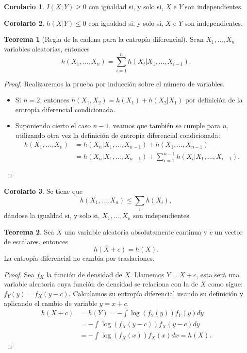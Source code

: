 \documentclass[12pt,a4paper]{report} %
\theoremstyle{definition}
\newtheorem{theorem}{Teorema}[section]
\newtheorem{corollary}{Corolario}[theorem]
\begin{document}
\begin{corollary}\label{c:im_indc}
$I(X;Y)\ge 0$ con igualdad si, y solo si, $X$ e $Y$ son independientes.\\
\end{corollary}

\begin{corollary}
$h(X|Y) \le 0$ con igualdad si, y solo si, $X$ e $Y$ son independientes.\\
\end{corollary}

\begin{theorem}[Regla de la cadena para la entropía diferencial] Sean $X_1,\dots, X_n$ variables aleatorias, entonces
  \[
h(X_1,\dots,X_n) = \sum_{i=1}^n h(X_i|X_1,\dots, X_{i-1}).
  \]
\end{theorem}

\begin{proof}
  Realizaremos la prueba por inducción sobre el número de variables.
  \begin{itemize}
  \item Si $n=2$, entonces $h(X_1,X_2) = h(X_1) + h(X_2|X_1)$ por definición de la entropía diferencial condicionada.
  \item Suponiendo cierto el caso $n-1$, veamos que también se cumple para $n$, utilizando otra vez la definición de entropía diferencial condicionada:
    \begin{align*}
h(X_1,\dots,X_n) &= h(X_n|X_1,\dots, X_{n-1}) + h(X_1,\dots, X_{n-1})\\ &= h(X_n|X_1,\dots,X_{n-1}) + \sum_{i=1}^{n-1}h(X_i|X_1,\dots,X_{i-1}).
    \end{align*}
  \end{itemize}
\end{proof}

\begin{corollary} Se tiene que
  \[h(X_1,\dots, X_n) \leq \sum_i h(X_i),\]
  dándose la igualdad si, y solo si, $X_1,\dots, X_n$ son independientes.\\
\end{corollary}

\begin{theorem}
  Sea $X$ una variable aleatoria absolutamente continua y $c$ un vector de escalares, entonces
  \[
  h(X+c) = h(X).
  \]
  La entropía diferencial no cambia por traslaciones.
\end{theorem}

\begin{proof}
  Sea $f_X$ la función de densidad de $X$. Llamemos $Y = X+ c$, esta será una variable aleatoria cuya función de densidad se relaciona con la de $X$ como sigue: $f_Y(y)=f_X(y-c)$. Calculamos su entropía diferencial usando su definición y aplicando el cambio de variable $y = x + c$.
  \begin{align*}
    h(X+c) &= h(Y) = - \int \log \left(f_Y(y)\right)f_Y(y) dy\\
    &= - \int  \log \left(f_X(y-c)\right) f_X(y-c) dy\\
    &= - \int  \log \left(f_X(x)\right) f_X(x) dx = h(X).
  \end{align*}
\end{proof}
\end{document}
